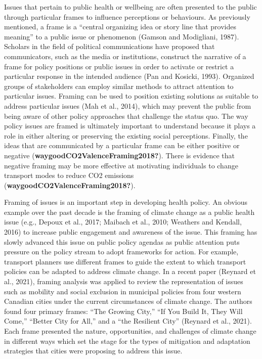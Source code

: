 \documentclass[]{elsarticle} %
\begin{document}
Issues that pertain to public health or wellbeing are often presented to
the public through particular frames to influence perceptions or
behaviours. As previously mentioned, a frame is a ``central organizing
idea or story line that provides meaning'' to a public issue or
phenomenon (Gamson and Modigliani, 1987). Scholars in the field of
political communications have proposed that communicators, such as the
media or institutions, construct the narrative of a frame for policy
positions or public issues in order to activate or restrict a particular
response in the intended audience (Pan and Kosicki, 1993). Organized
groups of stakeholders can employ similar methods to attract attention
to particular issues. Framing can be used to position existing solutions
as suitable to address particular issues (Mah et al., 2014), which may
prevent the public from being aware of other policy approaches that
challenge the status quo. The way policy issues are framed is ultimately
important to understand because it plays a role in either altering or
preserving the existing social perceptions. Finally, the ideas that are
communicated by a particular frame can be either positive or negative
(\textbf{waygoodCO2ValenceFraming2018?}). There is evidence that
negative framing may be more effective at motivating individuals to
change transport modes to reduce CO2 emissions
(\textbf{waygoodCO2ValenceFraming2018?}).

Framing of issues is an important step in developing health policy. An
obvious example over the past decade is the framing of climate change as
a public health issue (e.g., Depoux et al., 2017; Maibach et al., 2010;
Weathers and Kendall, 2016) to increase public engagement and awareness
of the issue. This framing has slowly advanced this issue on public
policy agendas as public attention puts pressure on the policy stream to
adopt frameworks for action. For example, transport planners use
different frames to guide the extent to which transport policies can be
adapted to address climate change. In a recent paper (Reynard et al.,
2021), framing analysis was applied to review the representation of
issues such as mobility and social exclusion in municipal policies from
four western Canadian cities under the current circumstances of climate
change. The authors found four primary frames: ``The Growing City,''
``If You Build It, They Will Come,'' ``Better City for All,'' and a
``the Resilient City'' (Reynard et al., 2021). Each frame presented the
nature, opportunities, and challenges of climate change in different
ways which set the stage for the types of mitigation and adaptation
strategies that cities were proposing to address this issue.
\end{document}

